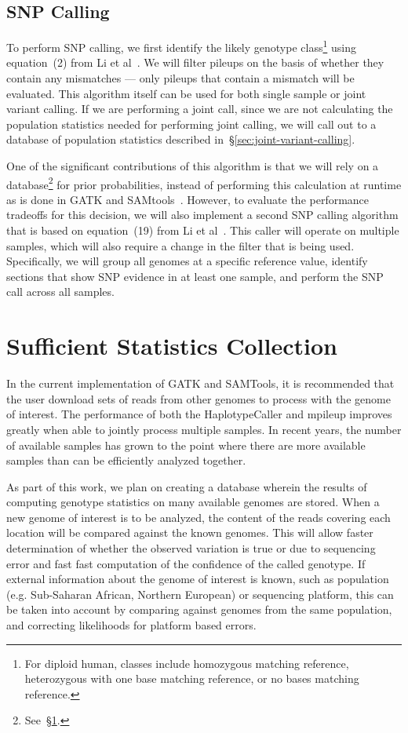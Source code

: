 \documentclass[11pt]{article}
\begin{document}
\subsection{SNP Calling}
\label{sec:SNP-calling}

To perform SNP calling, we first identify the likely genotype class\footnote{For diploid human, classes include homozygous
matching reference, heterozygous with one base matching reference, or no bases matching reference.} using equation~(2)
from Li et al~\cite{li11}. We will filter pileups on the basis of whether they contain any mismatches --- only pileups that contain
a mismatch will be evaluated. This algorithm itself can be used for both single sample or joint variant calling. If we are performing
a joint call, since we are not calculating the population statistics needed for performing joint calling, we will call out to a database
of population statistics described in~\S\ref{sec:joint-variant-calling}.

One of the significant contributions of this algorithm is that we will rely on a database\footnote{See~\S\ref{sec:sufficient-statistics}.}
for prior probabilities, instead of performing this calculation at runtime as is done in GATK and SAMtools~\cite{mckenna10, li11}.
However, to evaluate the performance tradeoffs for this decision, we will also implement a second SNP calling algorithm that is
based on equation~(19) from Li et al~\cite{li11}. This caller will operate on multiple samples, which will also require a change in
the filter that is being used. Specifically, we will group all genomes at a specific reference value, identify sections that show SNP
evidence in at least one sample, and perform the SNP call across all samples.

\section{Sufficient Statistics Collection}
\label{sec:sufficient-statistics}

In the current implementation of GATK and SAMTools, it is recommended that the user download sets of reads from other genomes
to process with the genome of interest. The performance of both the HaplotypeCaller and mpileup improves greatly when able
to jointly process multiple samples. In recent years, the number of available samples has grown to the point where there are
more available samples than can be efficiently analyzed together.

As part of this work, we plan on creating a database wherein the results of computing genotype statistics on many available genomes
are stored. When a new genome of interest is to be analyzed, the content of the reads covering each location will be compared against
the known genomes. This will allow faster determination of whether the observed variation is true or due to sequencing error and
fast fast computation of the confidence of the called genotype. If external information about the genome of interest is known, such as
population (e.g. Sub-Saharan African, Northern European) or sequencing platform, this can be taken into account by comparing
against genomes from the same population, and correcting likelihoods for platform based errors. 
\end{document}
